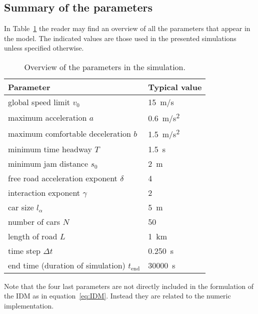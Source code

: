 \subsection{Summary of the parameters}
In Table~\ref{tab:param} the reader may find an overview of all the parameters that appear in the model. The indicated values are those used in the presented simulations unless specified otherwise.
\begin{table}
    \begin{center}
        \begin{tabular}[pos]{p{} p{}}
            \toprule
            Parameter & Typical value\\
            \midrule
            global speed limit $v_0$ & \SI{15}{m/s} \\
            maximum acceleration $a$ & \SI{0.6}{m/s^2} \\
            maximum comfortable deceleration $b$ & \SI{1.5}{m/s^2} \\
            minimum time headway $T$ & \SI{1.5}{s} \\
            minimum jam distance $s_0$ & \SI{2}{m} \\
            free road acceleration exponent $\delta$ & 4 \\
            interaction exponent $\gamma$ & 2\\
            car size $l_\alpha$ & \SI{5}{m} \\
            number of cars $N$ & 50\\
            length of road $L$ & \SI{1}{km} \\
            time step $\Delta t$ & \SI{0.250}{s} \\
            end time (duration of simulation) $t_\mathrm{end}$ &  \SI{30000}{s}\\
            \bottomrule
        \end{tabular}
    \end{center}
    \caption{Overview of the parameters in the simulation.}
    \label{tab:param}
\end{table}


Note that the four last parameters are not directly included in the formulation of the IDM as in equation~\eqref{eq:IDM}. Instead they are related to the numeric implementation.
